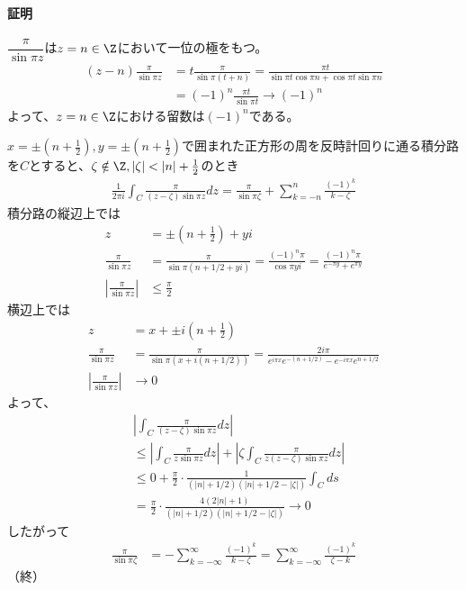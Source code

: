 \paragraph{証明}
$\dfrac{\pi}{\sin\pi z}$は$z=n\in\Z$において一位の極をもつ。
\begin{align*}
    (z-n)\frac{\pi}{\sin\pi z}
    &=t\frac{\pi}{\sin\pi(t+n)}
    =\frac{\pi t}{\sin\pi t\cos\pi n+\cos\pi t\sin\pi n}\\
    &=(-1)^n \frac{\pi t}{\sin\pi t}
    \longrightarrow (-1)^n
\end{align*} 
よって、$z=n\in\Z$における留数は$(-1)^n$である。

$x=\pm (n+\frac{1}{2}), y=\pm (n+\frac{1}{2})$で囲まれた正方形の周を反時計回りに通る積分路を$C$とすると、$\zeta\notin\Z, |\zeta|<|n|+\frac{1}{2}$のとき
\begin{align*}
    \frac{1}{2\pi i}\int_{C}\frac{\pi}{(z-\zeta)\sin\pi z}dz
    =\frac{\pi}{\sin\pi \zeta}
     +\sum_{k=-n}^{n}\frac{(-1)^k}{k-\zeta}
\end{align*}
積分路の縦辺上では
\begin{align*}
    z&=\pm (n+\frac{1}{2})+yi\\
    \frac{\pi}{\sin\pi z}
    &=\frac{\pi}{\sin\pi(n+1/2+yi)}
    =\frac{(-1)^n\pi}{\cos\pi yi}
    =\frac{(-1)^n\pi}{e^{-\pi y}+e^{\pi y}}\\
    \left|\frac{\pi}{\sin\pi z}\right|&\le\frac{\pi}{2}
\end{align*}
横辺上では
\begin{align*}
    z&=x+\pm i(n+\frac{1}{2})\\
    \frac{\pi}{\sin\pi z}
    &=\frac{\pi}{\sin\pi(x+i(n+1/2))}
    =\frac{2i\pi}{e^{i\pi x}e^{-(n+1/2)}-e^{-i\pi x}e^{n+1/2}}\\
    \left|\frac{\pi}{\sin\pi z}\right|&\longrightarrow 0
\end{align*}
よって、
\begin{align*}
    &\left|\int_{C}\frac{\pi}{(z-\zeta)\sin\pi z}dz\right|\\
    &\le \left|\int_{C}\frac{\pi}{z\sin\pi z}dz\right|
    +\left|\zeta\int_{C}\frac{\pi}{z(z-\zeta)\sin\pi z}dz\right|\\
    &\le 0+\frac{\pi}{2}\cdot\frac{1}{(|n|+1/2)(|n|+1/2-|\zeta|)}\int_{C}ds\\
    &=\frac{\pi}{2}\cdot\frac{4(2|n|+1)}{(|n|+1/2)(|n|+1/2-|\zeta|)}\longrightarrow0
\end{align*}
したがって
\begin{align*}
    \frac{\pi}{\sin\pi \zeta}
     &=-\sum_{k=-\infty}^{\infty}\frac{(-1)^k}{k-\zeta}
    =\sum_{k=-\infty}^{\infty}\frac{(-1)^k}{\zeta-k}
\end{align*}
（終）



